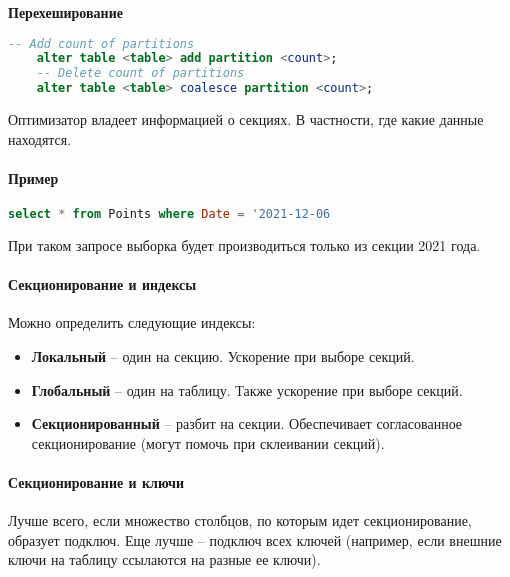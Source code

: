 \textbf{Перехеширование}

\begin{lstlisting}[language=SQL]
    -- Add count of partitions
    alter table <table> add partition <count>;
    -- Delete count of partitions
    alter table <table> coalesce partition <count>;
\end{lstlisting}

\begin{proposition}
	Оптимизатор владеет информацией о секциях. В частности, где какие данные находятся.
\end{proposition}

\paragraph{Пример}

\begin{lstlisting}[language=SQL]
    select * from Points where Date = '2021-12-06
\end{lstlisting}

При таком запросе выборка будет производиться только из секции 2021 года.

\paragraph{Секционирование и индексы}

Можно определить следующие индексы:

\begin{itemize}
	\item \textbf{Локальный} -- один на секцию. Ускорение при выборе секций.
	\item \textbf{Глобальный} -- один на таблицу. Также ускорение при выборе секций.
	\item \textbf{Секционированный} -- разбит на секции. Обеспечивает согласованное
	      секционирование (могут помочь при склеивании секций).
\end{itemize}

\paragraph{Секционирование и ключи}

Лучше всего, если множество столбцов, по которым идет секционирование, образует подключ. Еще лучше
-- подключ всех ключей (например, если внешние ключи на таблицу ссылаются на разные ее ключи).

